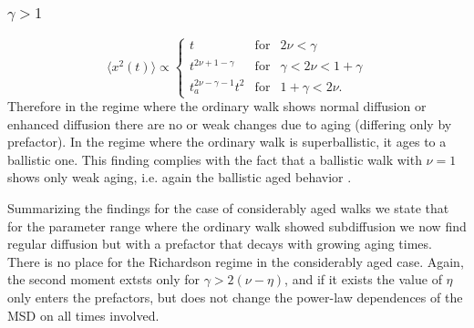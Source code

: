 \subsubsection{$\gamma> 1$ }
\begin{equation}
  \langle x^2(t) \rangle \propto  \left\{
  \begin{array}{lll}
    t & \mathrm{for} & 2\nu < \gamma  \\
    t^{2\nu+1-\gamma} &\mathrm{for} & \gamma <2 \nu < 1+\gamma \\ 
   t_a^{2\nu-\gamma-1 }t^2 & \mathrm{for} & 1+\gamma < 2\nu.
  \end{array}
  \right.
\end{equation}
Therefore in the regime where the ordinary walk shows normal diffusion or enhanced diffusion there are no or weak changes due to aging (differing only by prefactor). 
In the regime where the ordinary walk is superballistic, it ages to a ballistic one. This finding complies with the fact that a ballistic walk with $\nu = 1$ shows only weak aging, i.e. again the ballistic aged behavior \cite{Froemberg,Magdziarz}. 

Summarizing the findings for the case of considerably aged walks we state that for the parameter range where the ordinary walk showed subdiffusion we now find 
regular diffusion but with a prefactor that decays with growing aging times. 
There is no place for the Richardson regime in the considerably aged case.
Again, the second moment extsts only for $\gamma>2(\nu-\eta)$, and if it exists the value of $\eta$ only enters the prefactors, but does not change the power-law
dependences of the MSD on all times involved. 

